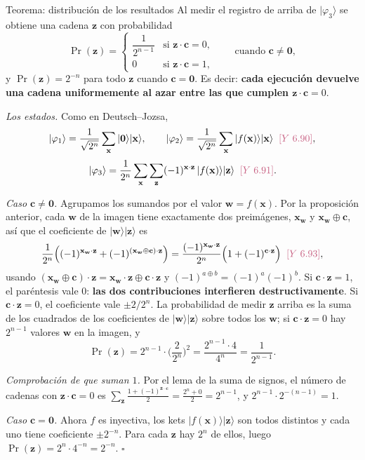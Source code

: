 \documentclass[11pt, a4paper, twoside, openright]{report}
\providecommand{\ket}[1]{|#1\rangle}
\newcommand{\bx}{\mathbf{x}}
\newcommand{\bz}{\mathbf{z}}
\newcommand{\bc}{\mathbf{c}}
\newcommand{\bw}{\mathbf{w}}
\newcommand{\bcero}{\mathbf{0}}
\newcommand{\Yan}[1]{\textcolor{rosaviejo}{\small[Y~#1]}}  %
\begin{document}
\begin{teoria}{Teorema: distribución de los resultados}
Al medir el registro de arriba de $\ket{\varphi_3}$ se obtiene una cadena $\bz$ con probabilidad
\[ \Pr(\bz) = \begin{cases} \dfrac{1}{2^{n-1}} & \text{si } \bz\cdot\bc = 0, \\[2mm] 0 & \text{si } \bz\cdot\bc = 1, \end{cases} \qquad\text{cuando } \bc\neq\bcero, \]
y $\Pr(\bz) = 2^{-n}$ para todo $\bz$ cuando $\bc = \bcero$. Es decir: \textbf{cada ejecución devuelve una cadena uniformemente al azar entre las que cumplen $\bz\cdot\bc = 0$}.
\end{teoria}

\begin{demo}
\textit{Los estados.} Como en Deutsch--Jozsa,
\[ \ket{\varphi_1} = \frac{1}{\sqrt{2^n}}\sum_{\bx}\ket{\bcero}\ket{\bx}, \qquad \ket{\varphi_2} = \frac{1}{\sqrt{2^n}}\sum_{\bx}\ket{f(\bx)}\ket{\bx} \;\;\Yan{6.90}, \]
\[ \ket{\varphi_3} = \frac{1}{2^n}\sum_{\bx}\sum_{\bz}(-1)^{\bx\cdot\bz}\,\ket{f(\bx)}\ket{\bz} \;\;\Yan{6.91}. \]

\textit{Caso $\bc\neq\bcero$.} Agrupamos los sumandos por el valor $\bw = f(\bx)$. Por la proposición anterior, cada $\bw$ de la imagen tiene exactamente dos preimágenes, $\bx_{\bw}$ y $\bx_{\bw}\oplus\bc$, así que el coeficiente de $\ket{\bw}\ket{\bz}$ es
\[ \frac{1}{2^n}\Big((-1)^{\bx_{\bw}\cdot\bz} + (-1)^{(\bx_{\bw}\oplus\bc)\cdot\bz}\Big) = \frac{(-1)^{\bx_{\bw}\cdot\bz}}{2^n}\Big(1 + (-1)^{\bc\cdot\bz}\Big) \;\;\Yan{6.93}, \]
usando $(\bx_{\bw}\oplus\bc)\cdot\bz = \bx_{\bw}\cdot\bz\oplus\bc\cdot\bz$ y $(-1)^{a\oplus b} = (-1)^a(-1)^b$. Si $\bc\cdot\bz = 1$, el paréntesis vale $0$: \textbf{las dos contribuciones interfieren destructivamente}. Si $\bc\cdot\bz = 0$, el coeficiente vale $\pm 2/2^n$. La probabilidad de medir $\bz$ arriba es la suma de los cuadrados de los coeficientes de $\ket{\bw}\ket{\bz}$ sobre todos los $\bw$; si $\bc\cdot\bz = 0$ hay $2^{n-1}$ valores $\bw$ en la imagen, y
\[ \Pr(\bz) = 2^{n-1}\cdot\Big(\frac{2}{2^n}\Big)^2 = \frac{2^{n-1}\cdot4}{4^n} = \frac{1}{2^{n-1}}. \]

\textit{Comprobación de que suman $1$.} Por el lema de la suma de signos, el número de cadenas con $\bz\cdot\bc = 0$ es $\sum_{\bz}\frac{1+(-1)^{\bz\cdot\bc}}{2} = \frac{2^n + 0}{2} = 2^{n-1}$, y $2^{n-1}\cdot2^{-(n-1)} = 1$.

\textit{Caso $\bc = \bcero$.} Ahora $f$ es inyectiva, los kets $\ket{f(\bx)}\ket{\bz}$ son todos distintos y cada uno tiene coeficiente $\pm2^{-n}$. Para cada $\bz$ hay $2^n$ de ellos, luego $\Pr(\bz) = 2^n\cdot4^{-n} = 2^{-n}$. \hfill$\square$
\end{demo}
\end{document}
